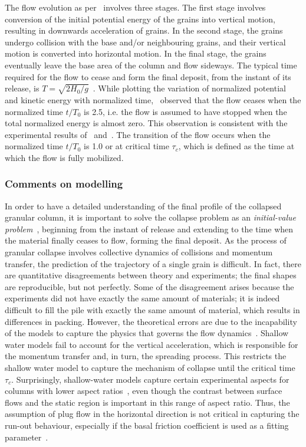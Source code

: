 The flow evolution as per~\citet{Staron2005} involves three stages. The first 
stage involves conversion of the initial potential energy of the grains into 
vertical motion, resulting in downwards acceleration of grains. In the second 
stage, the grains undergo collision with the base and/or neighbouring grains, 
and their vertical motion is converted into horizontal motion. In the final 
stage, the grains eventually leave the base area of the column and flow 
sideways. The typical time required for the flow to cease and form the final 
deposit, from the instant of its release, is 
$\textit{T}=\sqrt{2\textit{H}_{\textit{0}}/\textit{g}}$~\citep{Staron2005}. 
While plotting the variation of normalized potential and kinetic energy with 
normalized time,~\citet{Staron2005} observed that the flow ceases when the 
normalized time $\textit{t}/\textit{T}_0$ is 2.5, i.e. the flow is assumed to 
have stopped when the total normalized energy is almost zero. This observation 
is consistent with the experimental results of~\citet{Lube2005} 
and~\citet{Lajeunesse2005}. The transition of the flow occurs when the 
normalized time $\textit{t}/\textit{T}_0$ is 1.0 or at critical time 
$\tau_{\textit{c}}$, which is defined as the time at which the flow is fully 
mobilized.

\subsubsection{Comments on modelling}

In order to have a detailed understanding of the final profile of the collapsed 
granular column, it is important to solve the collapse problem as an 
\textit{initial-value problem}~\citep{Balmforth2005}, beginning from the 
instant of release and extending to the time when the material finally ceases 
to flow, forming the final deposit. As the process of granular collapse 
involves collective dynamics of collisions and momentum transfer, the 
prediction of the trajectory of a single grain is difficult. In fact, there are 
quantitative disagreements between theory and experiments; the final shapes are 
reproducible, but not perfectly. Some of the disagreement arises because the 
experiments did not have exactly the same amount of materials; it is indeed 
difficult to fill the pile with exactly the same amount of material, which 
results in differences in packing. However, the theoretical errors are due to 
the incapability of the models to capture the physics that governs the flow 
dynamics~\citep{Balmforth2005}. Shallow water models fail to account for the 
vertical acceleration, which is responsible for the momentum transfer and, in 
turn, the spreading process. This restricts the shallow water model to capture 
the mechanism of collapse until the critical time $\tau_{\textit{c}}$. 
Surprisingly, shallow-water models capture certain experimental aspects for 
columns with lower aspect 
ratios~\citep{Mangeney2010,Balmforth2005,Kerswell2005}, even though the 
contrast between surface flows and the static region is important in this range 
of aspect ratio. Thus, the assumption of plug flow in the horizontal direction 
is not critical in capturing the run-out behaviour, especially if the basal 
friction coefficient is used as a fitting parameter~\citep{Lajeunesse2005}. 

